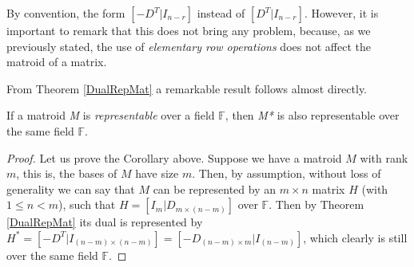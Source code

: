 By convention, the form $[-D^T |I_{n-r}]$ instead of $[D^T |I_{n-r}]$. However, it is important to remark that this does not bring any problem, because, as we previously stated, the use of \textit{elementary row operations} does not affect the matroid of a matrix. 

From Theorem \ref{DualRepMat} a remarkable result follows almost directly. 

\begin{corollary} \label{corollaryrepdual}
    If a matroid \textit{M} is \textit{representable} over a field $\mathbb{F}$, then \textit{M*} is also representable over the same field $\mathbb{F}$.
\end{corollary}

\begin{proof}
    Let us prove the Corollary above. Suppose we have a matroid $M$ with rank $m$, this is, the bases of $M$ have size $m$. Then, by assumption, without loss of generality we can say that $M$ can be represented by an $m \times n$ matrix $H$ (with $1\leq n < m$), such that $H=[I_{m}|D_{m \times (n-m)}]$ over $\mathbb{F}$. Then by Theorem \ref{DualRepMat} its dual is represented by $H^*=[-D^T|I_{(n-m) \times (n-m)}]=[-D_{(n-m) \times m}|I_{(n-m)}]$, which clearly is still over the same field $\mathbb{F}$.
\end{proof}

